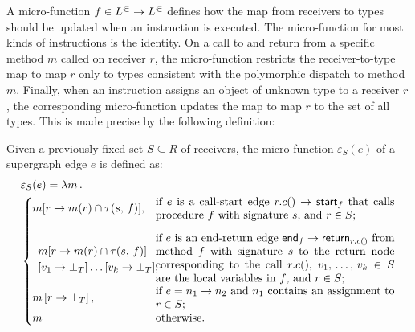 
A micro-function $f\in L^\Subset\to L^\Subset$ defines how the map from receivers to types should
be updated when an instruction is executed.
The micro-function for most kinds of instructions is the identity.
On a call to and return from a specific method $m$ called on receiver $r$,
the micro-function restricts the receiver-to-type map to map $r$ only to
types consistent with the polymorphic dispatch to method $m$.
Finally, when an instruction assigns an object of unknown type to a receiver
$r$, the corresponding micro-function updates the map to map $r$ to the
set of all types. This is made precise by the following definition:
\begin{definition}\label{def:microfn}
Given a previously fixed set $S \subseteq R$ of receivers, the micro-function $\varepsilon_S(e)$
of a supergraph edge $e$ is defined as:
  \begin{align}\label{eq:varepsilon}
      &\varepsilon_S(e)= \lambda m\,.\,\\
        &\begin{cases}
            m[r\to m(r)\cap \tau(s,\,f)],
            &\text{\parbox{75mm}{
                    if $e$ is a call-start edge $r.c() \to \textsf{start}_f$ that calls
                procedure $f$ with signature $s$,
                and $r\in S$;}}\\[3ex]
        \parbox{30mm}{\[\begin{array}{l}
                m[r\to m(r)\cap \tau(s,\,f)]\\
            [v_1\to\bot_T] \ldots [v_k\to\bot_T],
        \end{array}
        \]
        }
        &
        \text{\parbox{75mm}{
                if $e$ is an end-return edge
                $\textsf{end}_f \to \textsf{return}_{r.c()}$
                from method $f$ with signature $s$ to the return node corresponding
                to the call $r.c()$,
                $v_1,\,\dots,\,v_k\in S$ are the local variables
                in $f$,
                and $r\in S$;}}\\
            m\left[r\to \bot_T\right],
            &\text{\parbox{75mm}{if $e = n_1 \to n_2$ and $n_1$ contains an assignment
                    to $r\in S$;}}\\
            m
                &\text{otherwise.}
        \end{cases}
  \end{align}
\end{definition}

